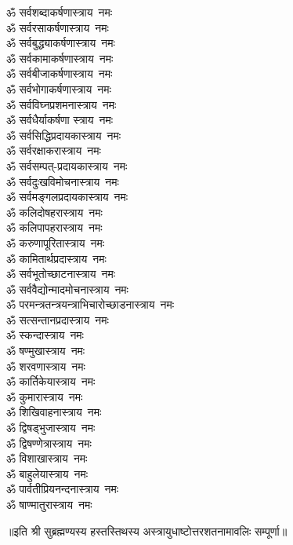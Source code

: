 \begin{flushleft}
\begin{multicols}{2}
ॐ सर्वशब्दाकर्षणास्त्राय~नमः\\
ॐ सर्वरसाकर्षणास्त्राय~नमः\\
ॐ सर्वबुद्ध्याकर्षणास्त्राय~नमः\\
ॐ सर्वकामाकर्षणास्त्राय~नमः\\
ॐ सर्वबीजाकर्षणास्त्राय~नमः\hfill{}\\
ॐ सर्वभोगाकर्षणास्त्राय~नमः\\
ॐ सर्वविघ्नप्रशमनास्त्राय~नमः\\
ॐ सर्वधैर्याकर्षणा स्त्राय~नमः\\
ॐ सर्वसिद्धिप्रदायकास्त्राय~नमः\\
ॐ सर्वरक्षाकरास्त्राय~नमः\\
ॐ सर्वसम्पत्-प्रदायकास्त्राय~नमः\\
ॐ सर्वदुःखविमोचनास्त्राय~नमः\\
ॐ सर्वमङ्गलप्रदायकास्त्राय~नमः\\
ॐ कलिदोषहरास्त्राय~नमः\\
ॐ कलिपापहरास्त्राय~नमः\hfill{}\\
ॐ करुणापूरितास्त्राय~नमः\\
ॐ कामितार्थप्रदास्त्राय~नमः\\
ॐ सर्वभूतोच्छाटनास्त्राय~नमः \\
ॐ सर्ववैद्योन्मादमोचनास्त्राय~नमः \\
ॐ परमन्त्रतन्त्रयन्त्राभिचारो\-च्छाडनास्त्राय~नमः\\
ॐ सत्सन्तानप्रदास्त्राय~नमः\\
ॐ स्कन्दास्त्राय~नमः\\
ॐ षण्मुखास्त्राय~नमः\\
ॐ शरवणास्त्राय~नमः\\
ॐ कार्तिकेयास्त्राय~नमः\hfill{}\\
ॐ कुमारास्त्राय~नमः\\
ॐ शिखिवाहनास्त्राय~नमः\\
ॐ द्विषड्भुजास्त्राय~नमः\\
ॐ द्विषण्णेत्रास्त्राय~नमः\\
ॐ विशाखास्त्राय~नमः\\
ॐ बाहुलेयास्त्राय~नमः\\
ॐ पार्वतीप्रियनन्दनास्त्राय~नमः\\
ॐ षाण्मातुरास्त्राय~नमः\\
\end{multicols}
\end{flushleft}
॥इति श्री सुब्रह्मण्यस्य हस्तस्तिथस्य अस्त्रायुधाष्टोत्तरशतनामावलिः सम्पूर्णा॥
